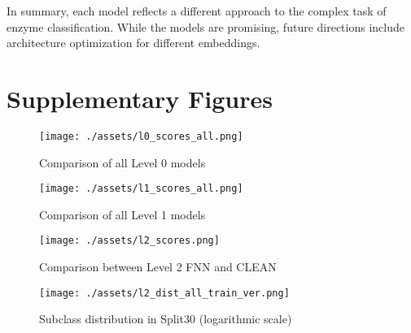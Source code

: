 \documentclass{bioinfo}
\begin{document}
In summary, each model reflects a different approach to the complex task of enzyme classification.
While the models are promising, future directions include architecture optimization for different embeddings.




\section{Supplementary Figures}\label{sec:supplementary figures}
\begin{figure}[!ht]
	\texttt{[image: ./assets/l0\_scores\_all.png]}
	\caption{Comparison of all Level 0 models}
	\label{fig:l0_comp_all}
\end{figure}

\begin{figure}[!ht]
	\texttt{[image: ./assets/l1\_scores\_all.png]}
	\caption{Comparison of all Level 1 models}
	\label{fig:l1_comp_all}
\end{figure}

\begin{figure}[!ht]
	\texttt{[image: ./assets/l2\_scores.png]}
	\caption{Comparison between Level 2 FNN and CLEAN}
	\label{fig:FNN_scores_l2}
\end{figure}
\begin{figure}[!ht]
\texttt{[image: ./assets/l2\_dist\_all\_train\_ver.png]}
\caption{Subclass distribution in Split30 (logarithmic scale)}\label{fig:l2_dist_train}
\end{figure}

\cleardoublepage

 

\end{document}

